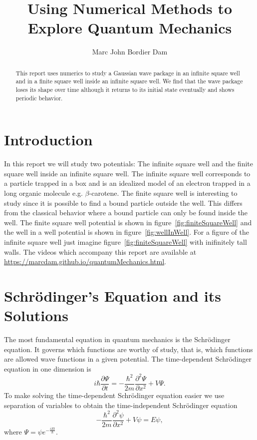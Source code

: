 \documentclass[12pt,a4paper]{article}
\author{Marc John Bordier Dam}
\title{Using Numerical Methods to Explore Quantum Mechanics}
\newcommand{\pdiff}[2]{\frac{\partial #1}{\partial #2}}
\newcommand{\pdiffn}[3]{\frac{\partial^{#3} #1}{\partial #2^{#3}}}
\begin{document}
\maketitle

\begin{abstract}
This report uses numerics to study a Gaussian wave package in an infinite square well and in a finite square well inside an infinite square well. We find that the wave package loses its shape over time although it returns to its initial state eventually and shows periodic behavior.
\end{abstract}

\tableofcontents

\section{Introduction}
In this report we will study two potentials: The infinite square well and the finite square well inside an infinite square well. The infinite square well corresponds to a particle trapped in a box and is an idealized model of an electron trapped in a long organic molecule e.g. $\beta$-carotene. The finite square well is interesting to study since it is possible to find a bound particle outside the well. This differs from the classical behavior where a bound particle can only be found inside the well. The finite square well potential is shown in figure~\ref{fig:finiteSquareWell} and the well in a well potential is shown in figure~\ref{fig:wellInWell}. For a figure of the infinite square well just imagine figure~\ref{fig:finiteSquareWell} with inifinitely tall walls. The videos which accompany this report are available at \url{https://marcdam.github.io/quantumMechanics.html}.

\section{Schrödinger's Equation and its Solutions}
The most fundamental equation in quantum mechanics is the Schrödinger equation. It governs which functions are worthy of study, that is, which functions are allowed wave functions in a given potential. The time-dependent Schrödinger equation in one dimension is
\begin{equation}
i \hbar \pdiff{\Psi}{t} = - \frac{\hbar^2}{2 m} \pdiffn{\Psi}{x}{2} + V \Psi.
\end{equation}
To make solving the time-dependent Schrödinger equation easier we use separation of variables to obtain the time-independent Schrödinger equation
\begin{equation}
- \frac{\hbar^2}{2 m} \pdiffn{\psi}{x}{2} + V \psi = E \psi,
\end{equation}
where $\Psi = \psi e^{-\frac{i E t}{\hbar}}$.
\end{document}
